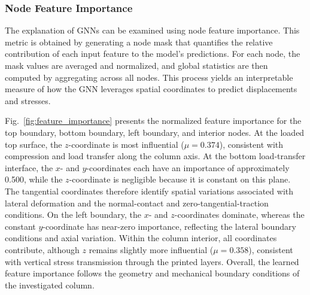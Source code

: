 \documentclass[review, authoryear, 12pt]{elsarticle}
\begin{document}
\subsubsection{Node Feature Importance}
\label{subsubsec:node_feature_importance}

The explanation of GNNs can be examined using node feature importance. This metric is obtained by generating a node mask that quantifies the relative contribution of each input feature to the model's predictions. For each node, the mask values are averaged and normalized, and global statistics are then computed by aggregating across all nodes. This process yields an interpretable measure of how the GNN leverages spatial coordinates to predict displacements and stresses.

Fig.~\ref{fig:feature_importance} presents the normalized feature importance for the top boundary, bottom boundary, left boundary, and interior nodes. At the loaded top surface, the $z$-coordinate is most influential ($\mu=0.374$), consistent with compression and load transfer along the column axis. At the bottom load-transfer interface, the $x$- and $y$-coordinates each have an importance of approximately 0.500, while the $z$-coordinate is negligible because it is constant on this plane. The tangential coordinates therefore identify spatial variations associated with lateral deformation and the normal-contact and zero-tangential-traction conditions. On the left boundary, the $x$- and $z$-coordinates dominate, whereas the constant $y$-coordinate has near-zero importance, reflecting the lateral boundary conditions and axial variation. Within the column interior, all coordinates contribute, although $z$ remains slightly more influential ($\mu=0.358$), consistent with vertical stress transmission through the printed layers. Overall, the learned feature importance follows the geometry and mechanical boundary conditions of the investigated column.
\end{document}
